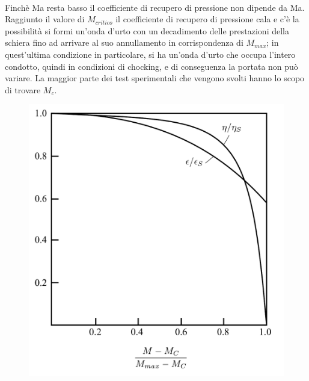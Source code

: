 \begin{figure}[h!]
\begin{minipage}{.4\textwidth}
  \label{fig:FuoriProgMach}
\end{minipage}
\end{figure}
\\Finchè Ma resta basso il coefficiente di recupero di pressione non dipende da Ma. Raggiunto il valore di $M_{critico}$ il coefficiente di recupero di pressione cala e c'è la possibilità si formi un'onda d'urto con un decadimento delle prestazioni della schiera fino ad arrivare al suo annullamento in corrispondenza di $M_{max}$; in quest'ultima condizione in particolare, si ha un'onda d'urto che occupa l'intero condotto, quindi in condizioni di chocking, e di conseguenza la portata non può variare. La maggior parte dei test sperimentali che vengono svolti hanno lo scopo di trovare $M_c$.
\begin{figure}[h!]
	\centering
	\begin{minipage}{.6\textwidth}
		\centering
		\includegraphics[width=\linewidth]{fig/FuoriProg3.pdf}
		\label{fig:FuoriProg3}
	\end{minipage}%
	\begin{minipage}{.4\textwidth}
		\centering

\end{minipage}
\end{figure}
